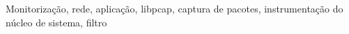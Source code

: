 

% 
% 
% 

\begin{keywords}
Monitorização, rede, aplicação, libpcap, captura de pacotes, instrumentação do núcleo de sistema, filtro
\end{keywords}
